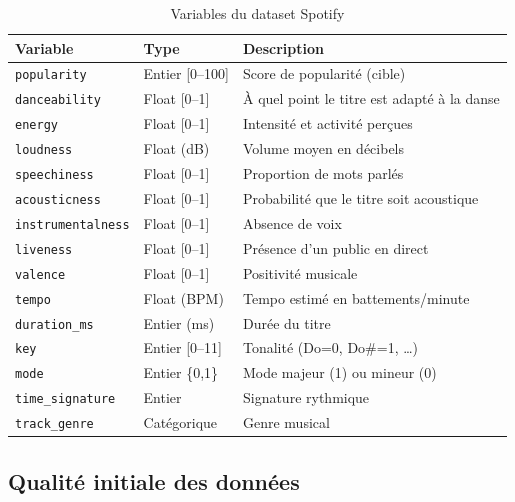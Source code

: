 \documentclass[12pt, a4paper]{article}
\begin{document}
\begin{table}[h!]
\centering
\caption{Variables du dataset Spotify}
\begin{tabular}{llp{7.5cm}}
\toprule
\textbf{Variable} & \textbf{Type} & \textbf{Description} \\
\midrule
\texttt{popularity}         & Entier [0–100]  & Score de popularité (cible) \\
\texttt{danceability}       & Float [0–1]     & À quel point le titre est adapté à la danse \\
\texttt{energy}             & Float [0–1]     & Intensité et activité perçues \\
\texttt{loudness}           & Float (dB)      & Volume moyen en décibels \\
\texttt{speechiness}        & Float [0–1]     & Proportion de mots parlés \\
\texttt{acousticness}       & Float [0–1]     & Probabilité que le titre soit acoustique \\
\texttt{instrumentalness}   & Float [0–1]     & Absence de voix \\
\texttt{liveness}           & Float [0–1]     & Présence d'un public en direct \\
\texttt{valence}            & Float [0–1]     & Positivité musicale \\
\texttt{tempo}              & Float (BPM)     & Tempo estimé en battements/minute \\
\texttt{duration\_ms}       & Entier (ms)     & Durée du titre \\
\texttt{key}                & Entier [0–11]   & Tonalité (Do=0, Do\#=1, \ldots) \\
\texttt{mode}               & Entier \{0,1\}  & Mode majeur (1) ou mineur (0) \\
\texttt{time\_signature}    & Entier          & Signature rythmique \\
\texttt{track\_genre}       & Catégorique     & Genre musical \\
\bottomrule
\end{tabular}
\end{table}

\subsection{Qualité initiale des données}
\end{document}
